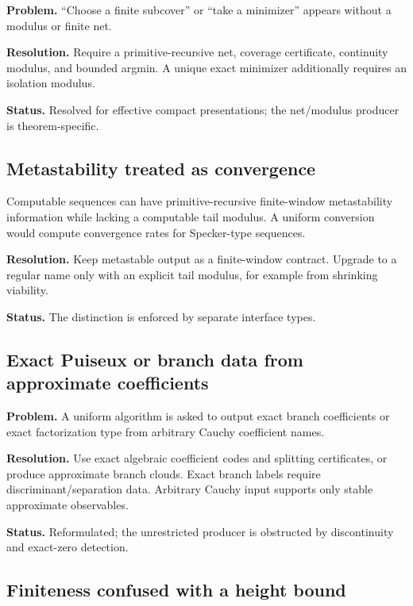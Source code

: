\textbf{Problem.} ``Choose a finite subcover'' or ``take a minimizer'' appears without a modulus or finite net.

\textbf{Resolution.} Require a primitive-recursive net, coverage certificate, continuity modulus, and bounded argmin.  A unique exact minimizer additionally requires an isolation modulus.

\textbf{Status.} Resolved for effective compact presentations; the net/modulus producer is theorem-specific.

\subsection{Metastability treated as convergence}

\begin{barrier}
Computable sequences can have primitive-recursive finite-window metastability information while lacking a computable tail modulus.  A uniform conversion would compute convergence rates for Specker-type sequences.
\end{barrier}

\textbf{Resolution.} Keep metastable output as a finite-window contract.  Upgrade to a regular name only with an explicit tail modulus, for example from shrinking viability.

\textbf{Status.} The distinction is enforced by separate interface types.

\subsection{Exact Puiseux or branch data from approximate coefficients}

\textbf{Problem.} A uniform algorithm is asked to output exact branch coefficients or exact factorization type from arbitrary Cauchy coefficient names.

\textbf{Resolution.} Use exact algebraic coefficient codes and splitting certificates, or produce approximate branch clouds.  Exact branch labels require discriminant/separation data.  Arbitrary Cauchy input supports only stable approximate observables.

\textbf{Status.} Reformulated; the unrestricted producer is obstructed by discontinuity and exact-zero detection.

\subsection{Finiteness confused with a height bound}

